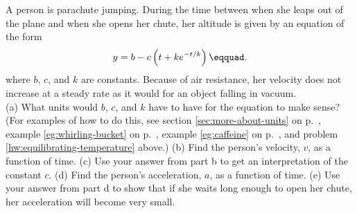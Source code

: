  A person is parachute jumping. During the
time between when she leaps out of the plane and when she
opens her chute, her altitude is given by an equation of the form
\begin{equation*}
      y = b - c\left(t+ke^{-t/k}\right)\eqquad.
\end{equation*}
where  $b$, $c$, and
$k$ are constants. Because of air resistance, her velocity
does not increase at a steady rate as it would for an
object falling in vacuum.\\
(a) What units would $b$, $c$, and $k$ have to have for the
equation to make sense? (For examples of how to do this, see
section \ref{sec:more-about-units} on p.~\pageref{sec:more-about-units},
example \ref{eg:whirling-bucket} on p.~\pageref{eg:whirling-bucket},
example \ref{eg:caffeine} on p.~\pageref{eg:caffeine},
and problem \ref{hw:equilibrating-temperature} above.)\hwendpart
(b) Find the person's velocity, $v$, as a function of time.\answercheck\hwendpart
(c) Use your answer from part b to get an interpretation
of the constant $c$.\hwendpart
(d) Find the person's acceleration, $a$, as a function of time.\answercheck\hwendpart
(e) Use your answer from part d to show that if she waits
long enough to open her chute, her acceleration will become very small.
